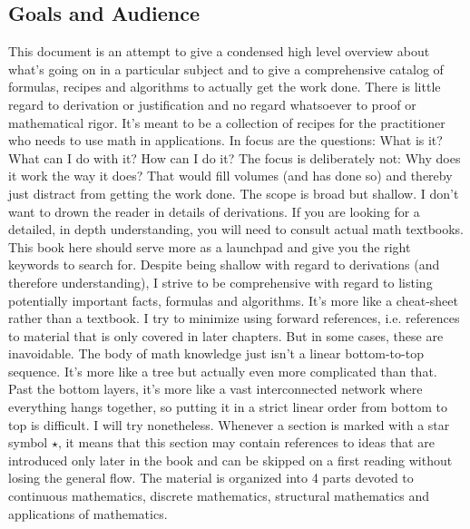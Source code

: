 \subsection{Goals and Audience}
This document is an attempt to give a condensed high level overview about what's going on in a particular subject and to give a comprehensive catalog of formulas, recipes and algorithms to actually get the work done. There is little regard to derivation or justification and no regard whatsoever to proof or mathematical rigor. It's meant to be a collection of recipes for the practitioner who needs to use math in applications. In focus are the questions: What is it? What can I do with it? How can I do it? The focus is deliberately not: Why does it work the way it does? That would fill volumes (and has done so) and thereby just distract from getting the work done. The scope is broad but shallow. I don't want to drown the reader in details of derivations. If you are looking for a detailed, in depth understanding, you will need to consult actual math textbooks. This book here should serve more as a launchpad and give you the right keywords to search for.  Despite being shallow with regard to derivations (and therefore understanding), I strive to be comprehensive with regard to listing potentially important facts, formulas and algorithms. It's more like a cheat-sheet rather than a textbook. I try to minimize using forward references, i.e. references to material that is only covered in later chapters. But in some cases, these are inavoidable. The body of math knowledge just isn't a linear bottom-to-top sequence. It's more like a tree but actually even more complicated than that. Past the bottom layers, it's more like a vast interconnected network where everything hangs together, so putting it in a strict linear order from bottom to top is difficult. I will try nonetheless. Whenever a section is marked with a star symbol $\star$, it means that this section may contain references to ideas that are introduced only later in the book and can be skipped on a first reading without losing the general flow. The material is organized into 4 parts devoted to continuous mathematics, discrete mathematics, structural mathematics and applications of mathematics. 




